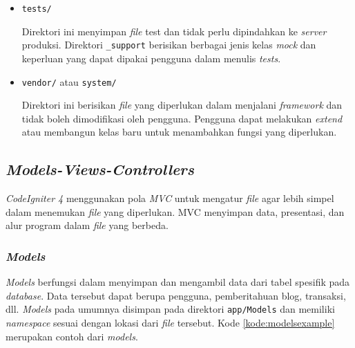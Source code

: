 \begin{itemize}
\item \texttt{tests/}

Direktori ini menyimpan \textit{file} test dan tidak perlu dipindahkan ke \textit{server} produksi. Direktori \verb|_support| berisikan berbagai jenis kelas \textit{mock} dan keperluan yang dapat dipakai pengguna dalam menulis \textit{tests}.

\item \texttt{vendor/} atau \texttt{system/}

Direktori ini berisikan \textit{file} yang diperlukan dalam menjalani \textit{framework} dan tidak boleh dimodifikasi oleh pengguna. Pengguna dapat melakukan \textit{extend} atau membangun kelas baru untuk menambahkan fungsi yang diperlukan.

\end{itemize}

\subsection{\textit{Models-Views-Controllers}}
\textit{CodeIgniter 4} menggunakan pola \textit{MVC} untuk mengatur \textit{file} agar lebih simpel dalam menemukan \textit{file} yang diperlukan. MVC menyimpan data, presentasi, dan alur program dalam \textit{file} yang berbeda.

\subsubsection{\textit{Models}}

\textit{Models} berfungsi dalam menyimpan dan mengambil data dari tabel spesifik pada \textit{database}. Data tersebut dapat berupa pengguna, pemberitahuan blog, transaksi, dll. \textit{Models} pada umumnya disimpan pada direktori \texttt{app/Models} dan memiliki \textit{namespace} sesuai dengan lokasi dari \textit{file} tersebut. Kode \ref{kode:modelsexample} merupakan contoh dari \textit{models}.


